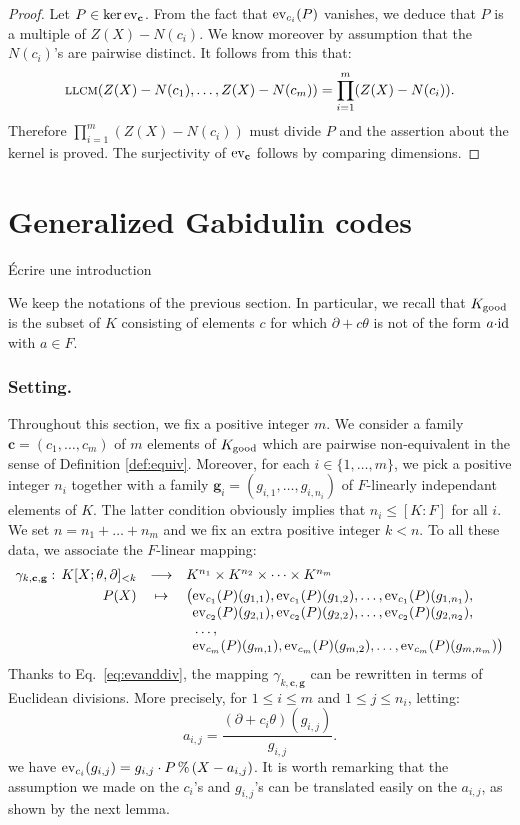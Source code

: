 \documentclass[a4paper]{llncs}
\def\todo#1{{\color{todo} #1}}
\newcommand{\id}{\textrm{\rm id}}
\newcommand{\ev}[1]{\textrm{\rm ev}_{#1}}
\renewcommand{\mod}{\,\%\,}
\newcommand{\llcm}{\textsc{llcm}}
\newcommand{\bc}{\textbf{c}}
\newcommand{\bg}{\textbf{g}}
\newcommand{\good}{\textrm{\rm good}}
\begin{document}
\begin{proof}
Let $P \in \ker \ev\bc$. From the fact that $\ev{c_i}(P)$ vanishes,
we deduce that $P$ is a multiple of $Z(X) - N(c_i)$. We know moreover
by assumption that the $N(c_i)$'s are pairwise distinct. It follows
from this that:
$$\llcm(Z(X)-N(c_1), \ldots, Z(X)-N(c_m)) = 
\prod_{i=1}^m (Z(X) - N(c_i)).$$
Therefore $\prod_{i=1}^m (Z(X) - N(c_i))$ must divide $P$ and the
assertion about the kernel is proved. The surjectivity of $\ev\bc$
follows by comparing dimensions.
\end{proof}

\section{Generalized Gabidulin codes}

\todo{Écrire une introduction}

We keep the notations of the previous section. In particular, we recall 
that $K_\good$ is the subset of $K$ consisting of elements $c$ for which 
$\partial + c\theta$ is not of the form $a{\cdot}\id$ with $a \in F$.

\subsubsection*{Setting.}

Throughout this section, we fix a positive integer $m$. We consider a 
family $\bc = (c_1, \ldots, c_m)$ of $m$ elements of $K_\good$ which are 
pairwise non-equivalent in the sense of Definition \ref{def:equiv}.
Moreover, for each $i \in \{1,\ldots,m\}$, we pick a positive integer
$n_i$ together with a family $\bg_i = (g_{i,1}, \ldots, g_{i,n_i})$ of 
$F$-linearly independant elements of $K$. The latter condition obviously
implies that $n_i \leq [K:F]$ for all $i$.
We set $n = n_1 + \ldots + n_m$ and we fix an extra positive integer
$k < n$.
To all these data, we associate the $F$-linear mapping:
$$\begin{array}{rcl}
\gamma_{k,\bc,\bg} : \, K[X;\theta,\partial]_{<k} & \longrightarrow 
 & K^{n_1} \times K^{n_2} \times \cdots \times K^{n_m} \smallskip \\
P(X) & \mapsto 
 & \big(\ev{c_1}(P)(g_{1,1}), \ev{c_1}(P)(g_{1,2}), \ldots, \ev{c_1}(P)(g_{1,n_1}), \\
&& \phantom{\big(}\ev{c_2}(P)(g_{2,1}), \ev{c_2}(P)(g_{2,2}), \ldots, \ev{c_2}(P)(g_{2,n_2}), \\
&& \phantom{\big(}\ldots, \\
&& \phantom{\big(}\ev{c_m}(P)(g_{m,1}), \ev{c_m}(P)(g_{m,2}), \ldots, \ev{c_m}(P)(g_{m,n_m})\big)
\end{array}$$
Thanks to Eq.~\eqref{eq:evanddiv}, the mapping $\gamma_{k,\bc,\bg}$
can be rewritten in terms of Euclidean divisions. More precisely,
for $1 \leq i \leq m$ and $1 \leq j \leq n_i$, letting:
\begin{equation}
\label{eq:aij}
a_{i,j} = \frac{(\partial + c_i\theta)(g_{i,j})}{g_{i,j}}.
\end{equation}
we have $\ev{c_i}(g_{i,j}) = g_{i,j} \cdot P \mod (X - a_{i,j})$.
It is worth remarking that the assumption we made on the $c_i$'s
and $g_{i,j}$'s can be translated easily on the $a_{i,j}$, as shown
by the next lemma.
\end{document}
